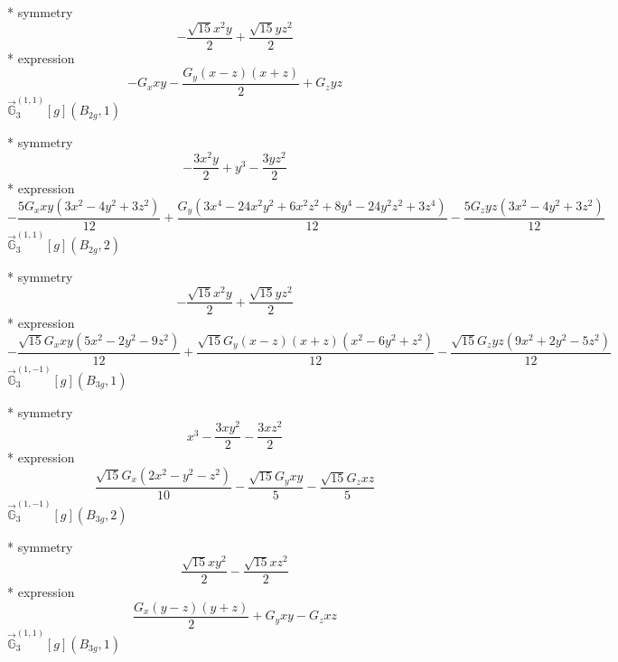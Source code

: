\documentclass[fleqn,8pt]{jsarticle}
\begin{document}
\noindent\quad ** symmetry
\begin{dmath*}
- \frac{\sqrt{15} x^{2} y}{2} + \frac{\sqrt{15} y z^{2}}{2}
\end{dmath*}
\noindent\quad ** expression
\begin{dmath*}
- G_{x} x y - \frac{G_{y} \left(x - z\right) \left(x + z\right)}{2} + G_{z} y z
\end{dmath*}
\noindent\quad $\vec{\mathbb{G}}_{3}^{(1,1)}[g](B_{2g},1)$

\noindent\quad ** symmetry
\begin{dmath*}
- \frac{3 x^{2} y}{2} + y^{3} - \frac{3 y z^{2}}{2}
\end{dmath*}
\noindent\quad ** expression
\begin{dmath*}
- \frac{5 G_{x} x y \left(3 x^{2} - 4 y^{2} + 3 z^{2}\right)}{12} + \frac{G_{y} \left(3 x^{4} - 24 x^{2} y^{2} + 6 x^{2} z^{2} + 8 y^{4} - 24 y^{2} z^{2} + 3 z^{4}\right)}{12} - \frac{5 G_{z} y z \left(3 x^{2} - 4 y^{2} + 3 z^{2}\right)}{12}
\end{dmath*}
\noindent\quad $\vec{\mathbb{G}}_{3}^{(1,1)}[g](B_{2g},2)$

\noindent\quad ** symmetry
\begin{dmath*}
- \frac{\sqrt{15} x^{2} y}{2} + \frac{\sqrt{15} y z^{2}}{2}
\end{dmath*}
\noindent\quad ** expression
\begin{dmath*}
- \frac{\sqrt{15} G_{x} x y \left(5 x^{2} - 2 y^{2} - 9 z^{2}\right)}{12} + \frac{\sqrt{15} G_{y} \left(x - z\right) \left(x + z\right) \left(x^{2} - 6 y^{2} + z^{2}\right)}{12} - \frac{\sqrt{15} G_{z} y z \left(9 x^{2} + 2 y^{2} - 5 z^{2}\right)}{12}
\end{dmath*}
\noindent\quad $\vec{\mathbb{G}}_{3}^{(1,-1)}[g](B_{3g},1)$

\noindent\quad ** symmetry
\begin{dmath*}
x^{3} - \frac{3 x y^{2}}{2} - \frac{3 x z^{2}}{2}
\end{dmath*}
\noindent\quad ** expression
\begin{dmath*}
\frac{\sqrt{15} G_{x} \left(2 x^{2} - y^{2} - z^{2}\right)}{10} - \frac{\sqrt{15} G_{y} x y}{5} - \frac{\sqrt{15} G_{z} x z}{5}
\end{dmath*}
\noindent\quad $\vec{\mathbb{G}}_{3}^{(1,-1)}[g](B_{3g},2)$

\noindent\quad ** symmetry
\begin{dmath*}
\frac{\sqrt{15} x y^{2}}{2} - \frac{\sqrt{15} x z^{2}}{2}
\end{dmath*}
\noindent\quad ** expression
\begin{dmath*}
\frac{G_{x} \left(y - z\right) \left(y + z\right)}{2} + G_{y} x y - G_{z} x z
\end{dmath*}
\noindent\quad $\vec{\mathbb{G}}_{3}^{(1,1)}[g](B_{3g},1)$
\end{document}
